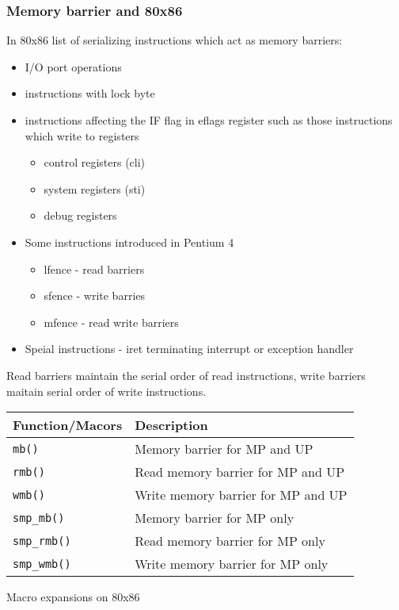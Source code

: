 \documentclass{article}
\begin{document}
\subsubsection{Memory barrier and 80x86}

  In 80x86 list of serializing instructions which act as memory
  barriers:


  \begin{itemize}
    \item I/O port operations
    \item instructions with lock byte
    \item instructions affecting the IF flag in eflags register such as those instructions which write to registers
      \begin{itemize}
        \item control registers (cli)
        \item system  registers (sti)
        \item debug   registers          
      \end {itemize}
    \item Some instructions introduced in Pentium 4
      \begin{itemize}
        \item lfence - read barriers
        \item sfence - write barries
        \item mfence - read write barriers
      \end{itemize}
    \item Speial instructions - iret terminating interrupt or exception handler                  
  \end{itemize}
  

Read barriers maintain the serial order of read instructions, write
barriers maitain serial order of write instructions.

\begin{center}
  \begin{tabular}{ l | l }    
    \hline
    Function/Macors & Description \\ \hline
    \lstinline{mb()} & Memory barrier for MP and UP \\ 
    \lstinline{rmb()} & Read memory barrier for MP and UP  \\ 
    \lstinline{wmb()} &  Write memory barrier for MP and UP \\
    \lstinline{smp_mb()} &  Memory barrier for MP only \\
    \lstinline{smp_rmb()} &  Read memory barrier for MP only \\
    \lstinline{smp_wmb()} &  Write memory barrier for MP only \\
    \hline
  \end{tabular}
\end{center}
  Macro expansions on  80x86
\end{document}
